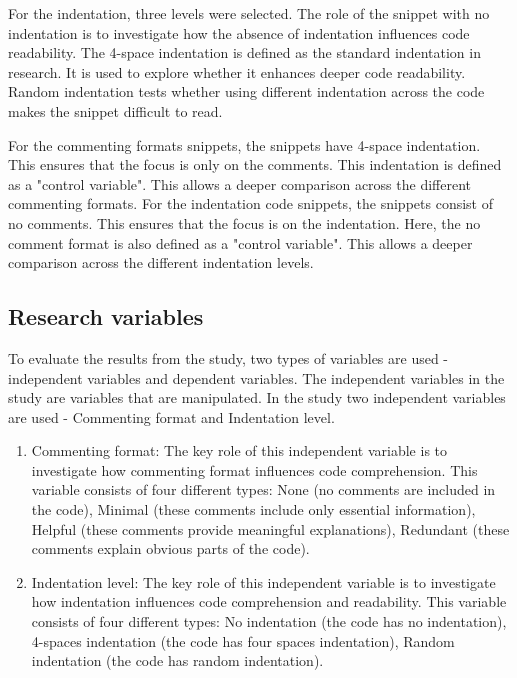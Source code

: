 For the indentation, three levels were selected. 
The role of the snippet with no indentation is to investigate how the absence of indentation influences code readability.
The 4-space indentation is defined as the standard indentation in research. It is used to explore whether it enhances deeper code readability.  
Random indentation tests whether using different indentation across the code makes the snippet difficult to read.



For the commenting formats snippets, the snippets have 4-space indentation. This ensures that the focus is only on the comments. This indentation is defined as a "control variable". This allows a deeper comparison across the different commenting formats. 
For the indentation code snippets, the snippets consist of no comments. This ensures that the focus is on the indentation. Here, the no comment format is also defined as a "control variable". This allows a deeper comparison across the different indentation levels. 

\subsection{Research variables}
To evaluate the results from the study, two types of variables are used - independent variables and dependent variables. The independent variables in the study are variables that are manipulated. In the study   two independent variables are used - Commenting format and Indentation level.

\begin{enumerate}
     \item Commenting format: The key role of this independent variable is to investigate how commenting format influences code comprehension. This variable consists of four different types: None (no comments are included in the code), Minimal (these comments include only essential information), Helpful (these comments provide meaningful explanations), Redundant (these comments explain obvious parts of the code). 

    \item Indentation level: The key role of this independent variable is to investigate how indentation influences code comprehension and readability. This variable consists of four different types: No indentation (the code has no indentation), 4-spaces indentation (the code has four spaces indentation), Random indentation (the code has random indentation). 
\end{enumerate}



